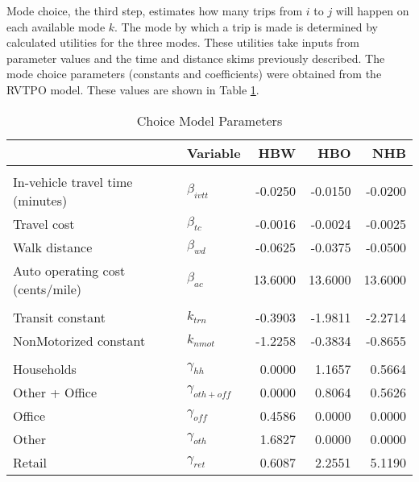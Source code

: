 \documentclass[fancy, masters,twoside]{byuthesis}
\begin{document}
Mode choice, the third step, estimates how many trips from \(i\) to \(j\) will happen on each available mode \(k\). The mode by which a trip is made is determined by calculated utilities for the three modes. These utilities take inputs from parameter values and the time and distance skims previously described. The mode choice parameters (constants and coefficients) were obtained from the RVTPO model. These values are shown in Table \ref{tab:choicecoeff}.

\begin{table}

\caption{\label{tab:choicecoeff}Choice Model Parameters}
\centering
\begin{tabular}[t]{llrrr}
\toprule
 & Variable & HBW & HBO & NHB\\
\midrule
\addlinespace[0.3em]
\multicolumn{5}{l}{\textbf{Mode Choice Coefficients}}\\
\hspace{1em}In-vehicle travel time (minutes) & $\beta_{ivtt}$ & -0.0250 & -0.0150 & -0.0200\\
\hspace{1em}Travel cost & $\beta_{tc}$ & -0.0016 & -0.0024 & -0.0025\\
\hspace{1em}Walk distance & $\beta_{wd}$ & -0.0625 & -0.0375 & -0.0500\\
\hspace{1em}Auto operating cost (cents/mile) & $\beta_{ac}$ & 13.6000 & 13.6000 & 13.6000\\
\addlinespace[0.3em]
\multicolumn{5}{l}{\textbf{Mode Choice Constants}}\\
\hspace{1em}Transit constant & $k_{trn}$ & -0.3903 & -1.9811 & -2.2714\\
\hspace{1em}NonMotorized constant & $k_{nmot}$ & -1.2258 & -0.3834 & -0.8655\\
\addlinespace[0.3em]
\multicolumn{5}{l}{\textbf{Destination Choice Parameters}}\\
\hspace{1em}Households & $\gamma_{hh}$ & 0.0000 & 1.1657 & 0.5664\\
\hspace{1em}Other + Office & $\gamma_{oth + off}$ & 0.0000 & 0.8064 & 0.5626\\
\hspace{1em}Office & $\gamma_{off}$ & 0.4586 & 0.0000 & 0.0000\\
\hspace{1em}Other & $\gamma_{oth}$ & 1.6827 & 0.0000 & 0.0000\\
\hspace{1em}Retail & $\gamma_{ret}$ & 0.6087 & 2.2551 & 5.1190\\
\bottomrule
\end{tabular}
\end{table}
\end{document}
